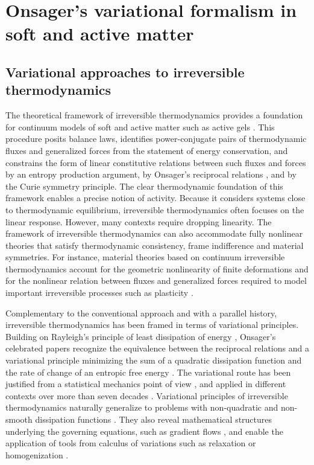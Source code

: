\documentclass[12pt]{iopart}
\begin{document}
	\section{Onsager's variational formalism in soft and active matter}\label{sec_0}
	
	\subsection{Variational approaches to irreversible thermodynamics}
	
	The theoretical framework of irreversible thermodynamics \cite{de2013non,kondepudi2014modern} provides a foundation for continuum models of soft and active matter such as active gels \cite{Prost:2015aa,julicher2018}. This procedure posits balance laws, identifies power-conjugate pairs of thermodynamic fluxes and generalized forces from the statement of energy conservation, and constrains the form of linear constitutive relations between such fluxes and forces by an entropy production argument, by Onsager's reciprocal relations \cite{Onsager1931,PhysRev.38.2265}, and by the Curie symmetry principle. The clear thermodynamic foundation of this framework enables a precise notion of activity. Because it considers systems close to thermodynamic equilibrium, irreversible thermodynamics often focuses on the linear response. However, many contexts require dropping linearity. The framework of irreversible thermodynamics can also accommodate fully nonlinear theories that satisfy thermodynamic consistency, frame indifference and material symmetries. For instance, material theories based on continuum irreversible thermodynamics account for the geometric nonlinearity of finite deformations and for the nonlinear relation between fluxes and generalized forces required to model important irreversible processes such as plasticity \cite{Coleman:1963aa,Coleman_Gurtin,ZIEGLER1987183,Maugin}. 
	
	Complementary to the conventional approach and with a parallel history, irreversible thermodynamics has been framed in terms of variational principles. Building on Rayleigh's principle of least dissipation of energy \cite{rayleigh1873}, Onsager's celebrated papers recognize the equivalence between the reciprocal relations and a variational principle minimizing the sum of a quadratic dissipation function and the rate of change of an entropic free energy \cite{Onsager1931,PhysRev.38.2265}. The variational route has been justified from a statistical mechanics point of view \cite{PhysRev.91.1505,peletier2014variational,D0SM02076A}, and applied in different contexts over more than seven decades \cite{Gyarmati,ZIEGLER1987183,BIOT19841,PhysRev.97.1463}. Variational principles of irreversible thermodynamics naturally generalize to problems with  non-quadratic and non-smooth dissipation functions \cite{EDELEN1972481,ZIEGLER1987183,Maugin,ORTIZ1999397,Mielke:2003aa,mielke2016generalization}. They also reveal mathematical structures underlying the governing equations, such as gradient flows \cite{peletier2014variational,mielke2016generalization},  and enable the application of tools from calculus of variations such as relaxation or homogenization \cite{ORTIZ1999397,MIEHE20022123,Mielke:2003aa}. 
	
\end{document}

